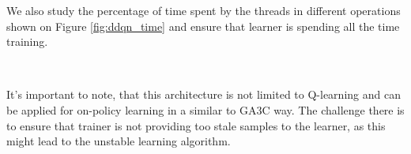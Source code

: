 We also study the percentage of time spent by the threads in different operations shown
on Figure \ref{fig:ddqn_time} and ensure that learner is spending all the time training.

\begin{figure*}[!t]
\\
\caption{Distribution of Actor and Learner threads time between operations}
\label{fig:ddqn_time}
\end{figure*}



It's important to note, that this architecture is not limited to Q-learning and can be applied
for on-policy learning in a similar to GA3C way. The challenge there is to ensure that trainer is
not providing too stale samples to the learner, as this might lead to the unstable learning
algorithm.
